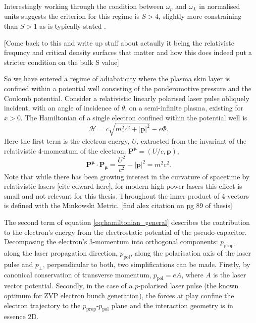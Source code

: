 Interestingly working through the condition between $\omega_p$ and $\omega_L$ in normalised units suggests the criterion for this regime is $S > 4$, slightly more constraining than $S>1$ as is typically stated \cite{savinModellingLaserPlasmaInteractions2019}.




[Come back to this and write up stuff about actaully it being the relativistc frequncy and critical density surfaces that matter and how this does indeed put a stricter condition on the bulk S value]

So we have entered a regime of adiabaticity where the plasma skin layer is confined within a potential well consisting of the ponderomotive pressure and the Coulomb potential. Consider a relativistic linearly polarised laser pulse obliquely incident, with an angle of incidence of $\theta$, on a semi-infinite plasma, existing for $x>0$. The Hamiltonian of a single electron confined within the potential well \cite{goldsteinClassicalMechanics2013} is
\begin{equation}\label{eq:hamiltonian_general}
	\mathcal{H} = c\sqrt{m^2_ec^2 + |\mathbf{p}|^2} - e\Phi.
\end{equation}
Here the first term is the electron energy, $U$, extracted from the invariant of the relativistic 4-momentum of the electron, $\mathbf{P^\mu} = (U/c, \mathbf{p})$,
\begin{equation}
	\mathbf{P^\mu \cdot P_\mu} = \frac{U^2}{c^2} - |\mathbf{p}|^2 = m^2c^2.
\end{equation}
Note that while there has been growing interest in the curvature of spacetime by relativistic lasers [cite edward here], for modern high power lasers this effect is small and not relevant for this thesis. Throughout the inner product of 4-vectors is defined with the Minkowski Metric. [find alex citation on pg 89 of thesis]

The second term of equation \ref{eq:hamiltonian_general} describes the contribution to the electron's energy from the electrostatic potential of the pseudo-capacitor. Decomposing the electron's 3-momentum into orthogonal components: $p_\mathrm{prop}$, along the laser propagation direction, $p_\mathrm{pol}$, along the polarisation axis of the laser pulse and $p_\perp$, perpendicular to both, two simplifications can be made. Firstly, by canonical conservation of transverse momentum, $p_\mathrm{pol} = eA$, where $A$ is the laser vector potential. Secondly, in the case of a $p$-polarised laser pulse (the known optimum for ZVP electron bunch generation), the forces at play confine the electron trajectory to the  $p_\mathrm{prop}$-$p_\mathrm{pol}$ plane and the interaction geometry is in essence \ac{2D}.

